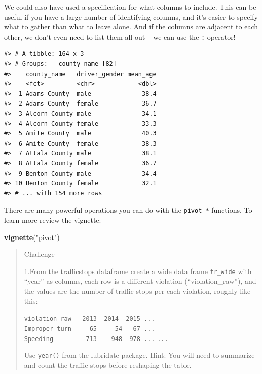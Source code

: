 \documentclass[]{book}
\newenvironment{Shaded}{\begin{snugshade}}{\end{snugshade}}
\newcommand{\CommentTok}[1]{\textcolor[rgb]{0.56,0.35,0.01}{\textit{#1}}}
\newcommand{\DataTypeTok}[1]{\textcolor[rgb]{0.13,0.29,0.53}{#1}}
\newcommand{\KeywordTok}[1]{\textcolor[rgb]{0.13,0.29,0.53}{\textbf{#1}}}
\newcommand{\NormalTok}[1]{#1}
\newcommand{\OperatorTok}[1]{\textcolor[rgb]{0.81,0.36,0.00}{\textbf{#1}}}
\newcommand{\StringTok}[1]{\textcolor[rgb]{0.31,0.60,0.02}{#1}}
\begin{document}
We could also have used a specification for what columns to include. This can be
useful if you have a large number of identifying columns, and it's easier to
specify what to gather than what to leave alone. And if the columns are adjacent to each other, we don't even need to list them all out -- we can use the \texttt{:} operator!

\begin{Shaded}
\end{Shaded}

\begin{verbatim}
#> # A tibble: 164 x 3
#> # Groups:   county_name [82]
#>    county_name   driver_gender mean_age
#>    <fct>         <chr>            <dbl>
#>  1 Adams County  male              38.4
#>  2 Adams County  female            36.7
#>  3 Alcorn County male              34.1
#>  4 Alcorn County female            33.3
#>  5 Amite County  male              40.3
#>  6 Amite County  female            38.3
#>  7 Attala County male              38.1
#>  8 Attala County female            36.7
#>  9 Benton County male              34.4
#> 10 Benton County female            32.1
#> # ... with 154 more rows
\end{verbatim}

There are many powerful operations you can do with the \texttt{pivot\_*} functions. To learn more review the vignette:

\begin{Shaded}
\begin{Highlighting}[]
\KeywordTok{vignette}\NormalTok{(}\StringTok{"pivot"}\NormalTok{)}
\end{Highlighting}
\end{Shaded}

\begin{quote}
Challenge

1.From the trafficstops dataframe create a wide data frame \texttt{tr\_wide} with
``year'' as columns, each row is a different violation (``violation\_raw''),
and the values are the
number of traffic stops per each violation, roughly like this:

\texttt{violation\_raw\ \ \textbar{}\ 2013\ \textbar{}\ 2014\ \textbar{}\ 2015\ ...}
\texttt{Improper\ turn\ \ \textbar{}\ \ \ 65\ \textbar{}\ \ \ \ 54\textbar{}\ \ \ 67\ ...}
\texttt{Speeding\ \ \ \ \ \ \ \textbar{}\ \ 713\ \textbar{}\ \ \ 948\textbar{}\ \ 978\ ...}
\texttt{...}

Use \texttt{year()} from the lubridate package. Hint: You will need to summarize
and count the traffic stops before reshaping the table.
\end{quote}
\end{document}
